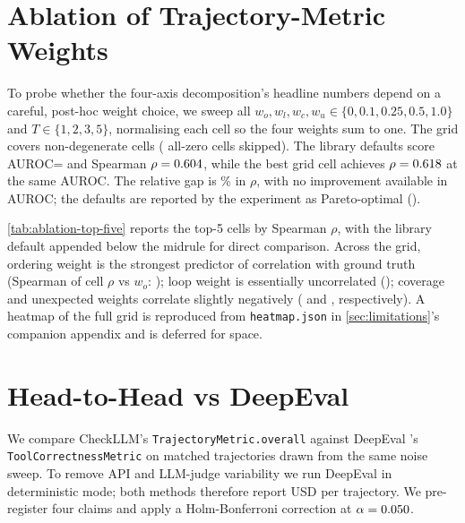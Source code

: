 \documentclass{article}
\begin{document}
\section{Ablation of Trajectory-Metric Weights}
\label{sec:ablation}

To probe whether the four-axis decomposition's headline numbers
depend on a careful, post-hoc weight choice, we sweep all
$w_o, w_l, w_c, w_u \in \{0, 0.1, 0.25, 0.5, 1.0\}$ and
$T \in \{1, 2, 3, 5\}$, normalising each cell so the four weights
sum to one. The grid covers \AblationNCells{} non-degenerate cells
(\AblationNSkipped{} all-zero cells skipped). The library defaults
score AUROC=\DefaultAuroc{} and Spearman
$\rho=0.604{}$, while the best grid cell achieves
$\rho=0.618{}$ at the same AUROC. The relative gap is
\DefaultBestGap{}\% in $\rho$, with no improvement available in
AUROC; the defaults are reported by the experiment as Pareto-optimal
(\DefaultIsParetoOptimal{}).

\autoref{tab:ablation-top-five} reports the top-5 cells by Spearman
$\rho$, with the library default appended below the midrule for
direct comparison. Across the grid, ordering weight is the strongest
predictor of correlation with ground truth (Spearman of cell
$\rho$ vs $w_o$: \WeightCorrOrdering{}); loop weight is essentially
uncorrelated (\WeightCorrLoop{}); coverage and unexpected weights
correlate slightly negatively (\WeightCorrCoverage{} and
\WeightCorrUnexpected{}, respectively). A heatmap of the full grid
is reproduced from \texttt{heatmap.json} in
\autoref{sec:limitations}'s companion appendix and is deferred for
space.

\begin{table}[t]
  \centering
  \caption{Top-5 grid cells by Spearman $\rho$ from the
  \AblationNCells{}-cell ablation, with library defaults below the
  midrule. The defaults are within \DefaultBestGap{}\% of the best
  cell on $\rho$, with no AUROC penalty.}
  \label{tab:ablation-top-five}
  \TableAblationTopFive
\end{table}

\section{Head-to-Head vs DeepEval}
\label{sec:headtohead}

We compare CheckLLM's \texttt{TrajectoryMetric.overall} against
DeepEval \DeepEvalVersion{}'s \texttt{ToolCorrectnessMetric}
\citep{confidentai2024deepeval} on \HHNTrajectories{} matched
trajectories drawn from the same noise sweep. To remove API and
LLM-judge variability we run DeepEval in deterministic mode; both
methods therefore report \CheckLLMCost{} USD per trajectory. We
pre-register four claims and apply a Holm-Bonferroni correction at
$\alpha=0.050{}$.
\end{document}
